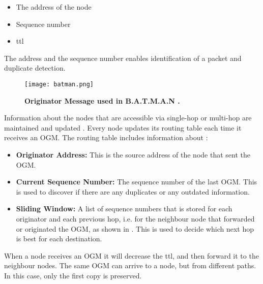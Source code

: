\begin{itemize}
\item The address of the node
\item Sequence number
\item \gls{ttl} 
\end{itemize}

The address and the sequence number enables identification of a packet and duplicate detection. 

\begin{figure}[b]
  \centering
    \texttt{[image: batman.png]}
     \caption[Originator Message in B.A.T.M.A.N]{\textbf{Originator Message used in B.A.T.M.A.N \cite{batman2}.}}
\label{fig:batman} 
\end{figure}


Information about the nodes that are accessible via single-hop or multi-hop are maintained and updated \cite{batman}. Every node updates its routing table each time it receives an OGM. The routing table includes information about \cite{batman2}:

\begin{itemize}
  \item \textbf{Originator Address:} This is the source address of the node that sent the OGM.
  \item \textbf{Current Sequence Number:} The sequence number of the last OGM. This is used to discover if there are any duplicates or any outdated information.
  \item \textbf{Sliding Window:} A list of sequence numbers that is stored for each originator and each previous hop, i.e. for the neighbour node that forwarded or originated the OGM, as shown in . This is used to decide which next hop is best for each destination. 
\end{itemize}

When a node receives an OGM it will decrease the \gls{ttl}, and then forward it to the neighbour nodes. The same OGM can arrive to a node, but from different paths. In this case, only the first copy is preserved. 


